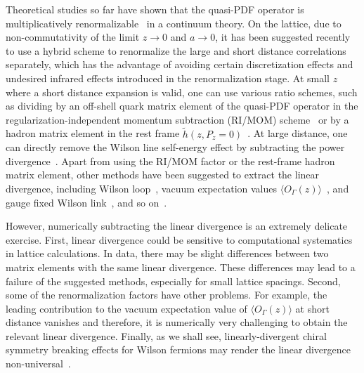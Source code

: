 Theoretical studies so far have shown that the quasi-PDF operator is multiplicatively renormalizable~\cite{Ji:2015jwa, Ji:2017oey,Ishikawa:2017faj,Green:2017xeu} in a continuum theory. On the lattice, due to non-commutativity of the limit $z\to 0$ and $a\to 0$, it has been suggested recently~\cite{Ji:2020brr} to use
a hybrid scheme to renormalize
the large and short distance correlations separately, which has the advantage of avoiding certain discretization effects and undesired infrared effects introduced in the renormalization stage. At small $z$ where
a short distance expansion is valid, one can use various ratio schemes, such as dividing by an off-shell quark matrix element of the quasi-PDF operator in the regularization-independent momentum subtraction (RI/MOM) scheme~\cite{Green:2017xeu,Chen:2017mzz,Alexandrou:2017huk} or by a hadron matrix element in the rest frame $\tilde{h}(z, P_z=0)$~\cite{Orginos:2017kos,Izubuchi:2018srq}. At large distance, one can
directly remove the Wilson line self-energy effect by subtracting the
power divergence~\cite{Chen:2016fxx,Ji:2017oey,Ishikawa:2017faj,Green:2017xeu}. Apart from using the RI/MOM factor or the rest-frame 
hadron matrix element, other methods have been suggested to extract the 
linear divergence, including Wilson loop~\cite{Chen:2016fxx,Zhang:2017bzy}, 
vacuum expectation values $\langle O_{\Gamma}(z)\rangle $~\cite{Braun:2018brg}, and gauge fixed Wilson link~\cite{Ji:2020ect}, and so on~\cite{Ji:2020brr}. 

However, numerically subtracting the linear divergence is an extremely delicate exercise. First, linear divergence could be sensitive to computational systematics in lattice calculations. In data, there may be slight differences between two matrix elements with the same linear divergence. These differences may lead to a failure of the suggested methods, especially for small lattice spacings. Second, some of the renormalization factors have other problems. For example, the leading contribution to the vacuum expectation value of $\langle O_{\Gamma}(z)\rangle $ at short distance vanishes and therefore, it is numerically very challenging to obtain the relevant linear divergence. Finally, as we shall see, linearly-divergent chiral symmetry breaking effects for Wilson fermions may render the linear divergence non-universal~\cite{Zhang:2020rsx}. 

